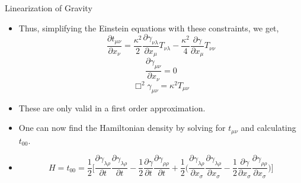 \documentclass[12pt,aspectratio=1610]{beamer}
\newcommand{\munu}{\mu\nu}
\begin{document}
\begin{frame}{Linearization of Gravity}
    \begin{itemize}
        \item Thus, simplifying the Einstein equations with these constraints, we get,
        \begin{equation*}
            \frac{\partial t_{\munu}}{\partial x_{\nu}} = \frac{\kappa^2}{2}\frac{\partial \gamma_{\nu\lambda}}{\partial x_{\mu}}T_{\nu\lambda} - \frac{\kappa^2}{4}\frac{\partial \gamma}{\partial x_{\mu}}T_{\nu\nu}
        \end{equation*}
        \begin{equation*}
            \frac{\partial \gamma_{\munu}}{\partial x_{\nu}} = 0
        \end{equation*}
        \begin{equation*}
            \Box^2\gamma_{\munu} = \kappa^2T_{\munu}
        \end{equation*}
        \item These are only valid in a first order approximation.
        \item One can now find the Hamiltonian density by solving for $t_{\munu}$ and calculating $t_{00}$.
        \item \begin{equation*}
    H = t_{00} = \frac{1}{2}\Bigg[\frac{\partial\gamma_{\lambda\rho}}{\partial t}\frac{\partial\gamma_{\lambda\rho}}{\partial t} - \frac{1}{2}\frac{\partial\gamma}{\partial t}\frac{\partial\gamma_{\rho\rho}}{\partial t} + \frac{1}{2}\Bigg(\frac{\partial\gamma_{\lambda\rho}}{\partial x_{\sigma}}\frac{\partial\gamma_{\lambda\rho}}{\partial x_{\sigma}} - \frac{1}{2}\frac{\partial\gamma}{\partial x_{\sigma}}\frac{\partial\gamma_{\rho\rho}}{\partial x_{\sigma}}\Bigg)\Bigg]
\end{equation*}
    \end{itemize}
\end{frame}
\end{document}
